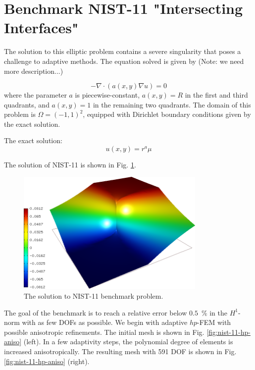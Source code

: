 \section{Benchmark NIST-11 "Intersecting Interfaces"}
\label{sec:bench-11}

The solution to this elliptic problem contains a severe
singularity that poses a challenge to adaptive methods.
The equation solved is given by (Note: we need more description...)

\begin{equation} \label{intersecting}
-\nabla \cdot (a(x,y) \nabla u) = 0 
\end{equation}
where the parameter $a$ is piecewise-constant,
$a(x,y) = R$ in the first and third quadrants,
and $a(x,y) = 1$ in the remaining two quadrants.
The domain of this problem is $\Omega = (-1, 1)^2$, equipped with
Dirichlet boundary conditions given by the exact solution.

The exact solution:
\begin{equation}\label{exact-nist-11}
u(x,y) = r^{a} \mu
\end{equation}

The solution of NIST-11 is shown in Fig. \ref{fig:sln-nist11}.

\begin{figure}[!ht]
\centering
\includegraphics[height=6cm]{nist/nist-11/solution.png}
\caption{The solution to NIST-11 benchmark problem.}
\label{fig:sln-nist11}
\end{figure}

The goal of the benchmark is to reach a relative error below
$0.5$~\% in the $H^1$-norm with as few DOFs as possible.
We begin with adaptive $hp$-FEM with possible anisotropic refinements.
The initial mesh is shown in Fig. \ref{fig:nist-11-hp-aniso} (left).
In a few adaptivity steps, the polynomial degree of elements is increased
anisotropically.
The resulting mesh with 591 DOF is shown in Fig. \ref{fig:nist-11-hp-aniso} (right).

